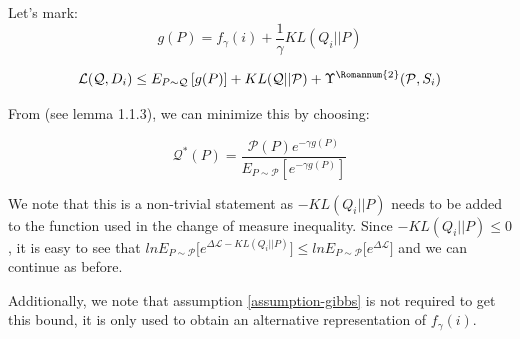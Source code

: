 \documentclass[letterpaper]{article}
\theoremstyle{definition}
\begin{document}
Let's mark:
$$g(P)=f_{\gamma}(i)+ \frac{1}{\gamma}KL(Q_i||P)$$

$$ \mathcal{L}(\mathcal{Q}, D_i)\leq E_{P\sim \mathcal{Q}}\left [g(P) \right ] + KL(\mathcal{Q}||\mathcal{P})+\Upsilon^{\text{\Romannum{2}}}(\mathcal{P}, S_i)$$

From \cite{Catoni2007} (see lemma 1.1.3), we can minimize this by choosing:

$$\mathcal{Q}^{*}(P)=\frac{\mathcal{P}(P) e^{-\gamma g(P)}}{E_{P\sim \mathcal{P}} \left [ e^{-\gamma g(P) } \right ]}$$

We note that this is a non-trivial statement as $-KL(Q_i||P)$ needs to be added to the function used in the change of measure inequality. Since $-KL(Q_i||P)\leq 0$, it is easy to see that $lnE_{P\sim \mathcal{P}}\bigl [e^{\Delta \mathcal{L}-KL(Q_i||P)}\bigr ]\leq lnE_{P\sim \mathcal{P}}\bigl [e^{\Delta \mathcal{L}}\bigr ]$ and we can continue as before.

Additionally, we note that assumption \ref{assumption-gibbs} is not required to get this bound, it is only used to obtain an alternative representation of $f_{\gamma}(i)$.








\end{document}

